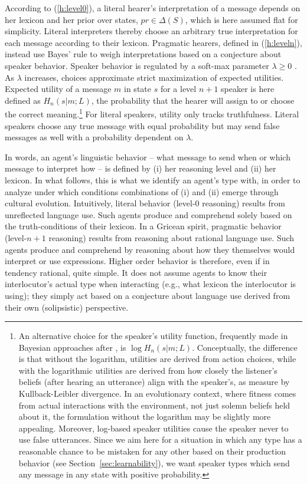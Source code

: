 \documentclass[a4paper, 11pt]{article}
\theoremstyle{Satz}
\newcommand{\state}{\ensuremath{s}\xspace}		%
\newcommand{\messg}{\ensuremath{m}\xspace}		%
\begin{document}
According to (\ref{h:level0}), a literal hearer's interpretation of a message depends on her
lexicon and her prior over states, $pr \in \Delta(S)$, which is here assumed flat for
simplicity. Literal interpreters thereby choose an arbitrary true interpretation for each
message according to their lexicon. Pragmatic hearers, defined in (\ref{h:leveln}), instead use
Bayes' rule to weigh interpretations based on a conjecture about speaker behavior. Speaker
behavior is regulated by a soft-max parameter $\lambda \geq 0$
\citep{luce:1959,sutton+barto:1998}. As $\lambda$ increases, choices approximate strict
maximization of expected utilities. Expected utility of a message $\messg$ in state $\state$
for a level $n+1$ speaker is here defined as $H_{n}(s|m;L)$, the probability that the hearer
will assign to or choose the correct meaning.\footnote{An alternative choice for the speaker's
  utility function, frequently made in Bayesian approaches after \citet{frank+goodman:2012}, is
  $\log H_{n}(s|m;L)$. Conceptually, the difference is that without the logarithm, utilities
  are derived from action choices, while with the logarithmic utilities are derived from how
  closely the listener's beliefs (after hearing an utterance) align with the speaker's, as
  measure by Kullback-Leibler divergence. In an evolutionary context, where fitness comes from
  actual interactions with the environment, not just solemn beliefs held about it, the
  formulation without the logarithm may be slightly more appealing. Moreover, log-based speaker
  utilities cause the speaker never to use false utterances. Since we aim here for a situation
  in which any type has a reasonable chance to be mistaken for any other based on their
  production behavior (see Section~\ref{sec:learnability}), we want speaker types which send
  any message in any state with positive probability.} For literal speakers, utility only
tracks truthfulness. Literal speakers choose any true message with equal probability but may
send false messages as well with a probability dependent on $\lambda$.

In words, an agent's linguistic behavior -- what message to send when or which message to
interpret how -- is defined by (i) her reasoning level and (ii) her lexicon. In what follows,
this is what we identify an agent's type with, in order to analyze under which conditions
combinations of (i) and (ii) emerge through cultural evolution. Intuitively, literal behavior
(level-$0$ reasoning) results from unreflected language use. Such agents produce and comprehend
solely based on the truth-conditions of their lexicon. In a Gricean spirit, pragmatic behavior
(level-$n+1$ reasoning) results from reasoning about rational language use. Such agents produce
and comprehend by reasoning about how they themselves would interpret or use
expressions. Higher order behavior is therefore, even if in tendency rational, quite simple. It
does not assume agents to know their interlocutor's actual type when interacting (e.g., what
lexicon the interlocutor is using); they simply act based on a conjecture about language use
derived from their own (solipsistic) perspective.
\end{document}
